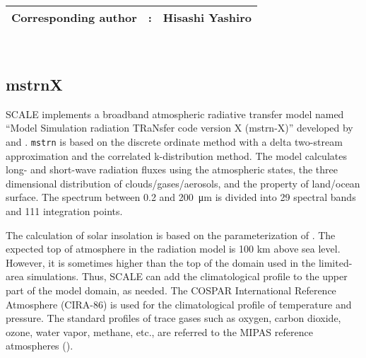 {\bf \Large
\begin{tabular}{ccc}
\hline
  Corresponding author & : & Hisashi Yashiro\\
\hline
\end{tabular}
}
\\

\subsection{mstrnX}
SCALE implements a broadband atmospheric radiative transfer model named ``Model Simulation radiation TRaNsfer code version X (mstrn-X)'' developed by \citet{nakajima_2000} and \citet{sekiguchi_2008}. \verb|mstrn| is based on the discrete ordinate method with a delta two-stream approximation and the correlated k-distribution method. The model calculates long- and short-wave radiation fluxes using the atmospheric states, the three dimensional distribution of clouds/gases/aerosols, and the property of land/ocean surface.
The spectrum between 0.2 and \SI{200}{\micro m} is divided into 29 spectral bands and 111 integration points.

The calculation of solar insolation is based on the parameterization of \citet{berger_1978}. The expected top of atmosphere in the radiation model is 100 km above sea level. However, it is sometimes higher than the top of the domain used in the limited-area simulations.
Thus, SCALE can add the climatological profile to the upper part of the model domain, as needed. The COSPAR International Reference Atmosphere (CIRA-86)  \citep{CSR_2006} is used for the climatological profile of temperature and pressure. The standard profiles of trace gases such as oxygen, carbon dioxide, ozone, water vapor, methane, etc., are referred to the MIPAS reference atmospheres (\citet{Remedios_2007}).
